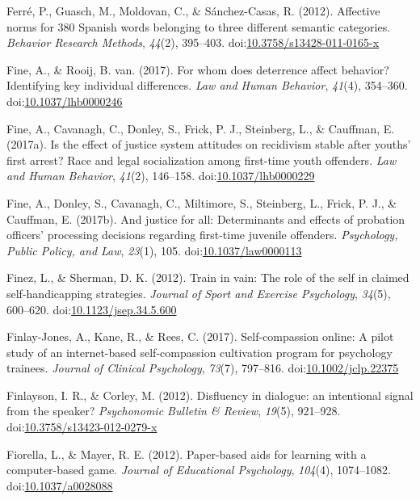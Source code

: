 \documentclass[english,man]{apa6}
\theoremstyle{definition}
\theoremstyle{definition}
\theoremstyle{definition}
\theoremstyle{remark}
\begin{document}
\hypertarget{ref-Ferre2012}{}
Ferré, P., Guasch, M., Moldovan, C., \& Sánchez-Casas, R. (2012).
Affective norms for 380 Spanish words belonging to three different
semantic categories. \emph{Behavior Research Methods}, \emph{44}(2),
395--403.
doi:\href{https://doi.org/10.3758/s13428-011-0165-x}{10.3758/s13428-011-0165-x}

\hypertarget{ref-Fine2017a}{}
Fine, A., \& Rooij, B. van. (2017). For whom does deterrence affect
behavior? Identifying key individual differences. \emph{Law and Human
Behavior}, \emph{41}(4), 354--360.
doi:\href{https://doi.org/10.1037/lhb0000246}{10.1037/lhb0000246}

\hypertarget{ref-Fine2017}{}
Fine, A., Cavanagh, C., Donley, S., Frick, P. J., Steinberg, L., \&
Cauffman, E. (2017a). Is the effect of justice system attitudes on
recidivism stable after youths' first arrest? Race and legal
socialization among first-time youth offenders. \emph{Law and Human
Behavior}, \emph{41}(2), 146--158.
doi:\href{https://doi.org/10.1037/lhb0000229}{10.1037/lhb0000229}

\hypertarget{ref-Fine2017b}{}
Fine, A., Donley, S., Cavanagh, C., Miltimore, S., Steinberg, L., Frick,
P. J., \& Cauffman, E. (2017b). And justice for all: Determinants and
effects of probation officers' processing decisions regarding first-time
juvenile offenders. \emph{Psychology, Public Policy, and Law},
\emph{23}(1), 105.
doi:\href{https://doi.org/10.1037/law0000113}{10.1037/law0000113}

\hypertarget{ref-Finez2012}{}
Finez, L., \& Sherman, D. K. (2012). Train in vain: The role of the self
in claimed self-handicapping strategies. \emph{Journal of Sport and
Exercise Psychology}, \emph{34}(5), 600--620.
doi:\href{https://doi.org/10.1123/jsep.34.5.600}{10.1123/jsep.34.5.600}

\hypertarget{ref-Finlay-Jones2017}{}
Finlay-Jones, A., Kane, R., \& Rees, C. (2017). Self-compassion online:
A pilot study of an internet-based self-compassion cultivation program
for psychology trainees. \emph{Journal of Clinical Psychology},
\emph{73}(7), 797--816.
doi:\href{https://doi.org/10.1002/jclp.22375}{10.1002/jclp.22375}

\hypertarget{ref-Finlayson2012}{}
Finlayson, I. R., \& Corley, M. (2012). Disfluency in dialogue: an
intentional signal from the speaker? \emph{Psychonomic Bulletin \&
Review}, \emph{19}(5), 921--928.
doi:\href{https://doi.org/10.3758/s13423-012-0279-x}{10.3758/s13423-012-0279-x}

\hypertarget{ref-Fiorella2012}{}
Fiorella, L., \& Mayer, R. E. (2012). Paper-based aids for learning with
a computer-based game. \emph{Journal of Educational Psychology},
\emph{104}(4), 1074--1082.
doi:\href{https://doi.org/10.1037/a0028088}{10.1037/a0028088}
\end{document}
